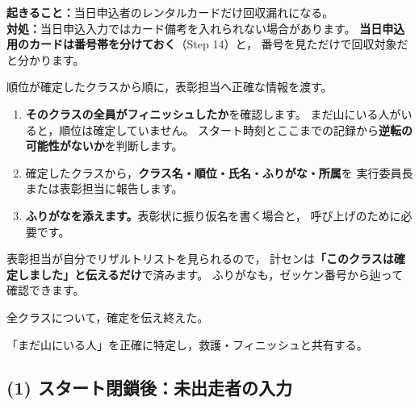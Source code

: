 \begin{Fail}
\textbf{起きること：}当日申込者のレンタルカードだけ回収漏れになる。\\
\textbf{対処：}当日申込入力ではカード備考を入れられない場合があります。
\textbf{当日申込用のカードは番号帯を分けておく}（Step 14）と，
番号を見ただけで回収対象だと分かります。
\end{Fail}


\begin{Goal}
順位が確定したクラスから順に，表彰担当へ正確な情報を渡す。
\end{Goal}

\begin{enumerate}
\item \textbf{そのクラスの全員がフィニッシュしたか}を確認します。
      まだ山にいる人がいると，順位は確定していません。
      スタート時刻とここまでの記録から\textbf{逆転の可能性がないか}を判断します。
\item 確定したクラスから，\textbf{クラス名・順位・氏名・ふりがな・所属}を
      実行委員長または表彰担当に報告します。
\item \textbf{ふりがなを添えます。}表彰状に振り仮名を書く場合と，
      呼び上げのために必要です。
\end{enumerate}

\begin{Note}[クラウドを使っている場合]
表彰担当が自分でリザルトリストを見られるので，
計センは\textbf{「このクラスは確定しました」と伝えるだけ}で済みます。
ふりがなも，ゼッケン番号から辿って確認できます。
\end{Note}

\begin{Done}
全クラスについて，確定を伝え終えた。
\end{Done}


\begin{Goal}
「まだ山にいる人」を正確に特定し，救護・フィニッシュと共有する。
\end{Goal}

\subsection*{(1) スタート閉鎖後：未出走者の入力}

